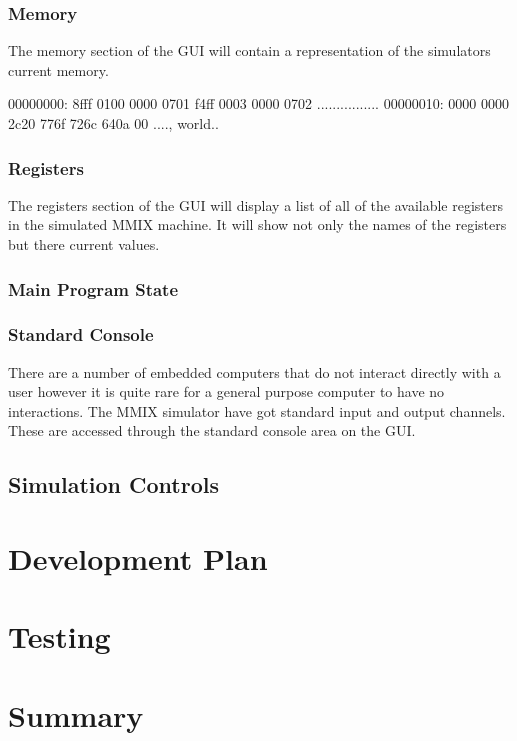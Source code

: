 \documentclass[11pt]{article} %
\begin{document}
\subsubsection{Memory}
The memory section of the GUI will contain a representation of the simulators current memory.


00000000: 8fff 0100 0000 0701 f4ff 0003 0000 0702 ................
00000010: 0000 0000 2c20 776f 726c 640a 00        ...., world..

\subsubsection{Registers}
The registers section of the GUI will display a list of all of the available registers in the simulated MMIX machine.  It will show not only the names of the registers but there current values.  
\subsubsection{Main Program State}
\subsubsection{Standard Console}
There are a number of embedded computers that do not interact directly with a user however it is quite rare for a general purpose computer to have no interactions.  The MMIX simulator have got standard input and output channels.  These are accessed through the standard console area on the GUI.
\subsection{Simulation Controls}
\section{Development Plan}


\section{Testing}


\section{Summary}

\end{document}
